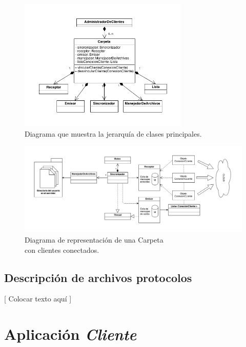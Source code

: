 \documentclass{article}
\begin{document}
\begin{figure}[h]
	\centering
	\includegraphics[width=0.72\textwidth]{images/Diagrama-modelo-servidor-parte2.png}
	\caption{Diagrama que muestra la jerarquía de clases principales.}
\end{figure}
\bigskip


\begin{figure}[h]
	\centering
	\includegraphics[width=1.0\textwidth]{images/Diagrama-modelo-servidor-parte3.png}
	\caption{Diagrama de representación de una Carpeta\\ con clientes conectados.}
\end{figure}
\bigskip






\subsection{Descripción de archivos  protocolos}

	[ Colocar texto aquí ]
\bigskip




\section{Aplicación \textit{Cliente}}
\end{document}
